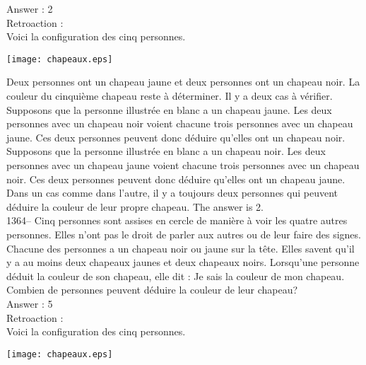 ﻿\documentclass[letterpaper, 12pt]{article}
\begin{document}
Answer : 2\\

Retroaction : \\
Voici la configuration des cinq personnes.
    \begin{center}
    \texttt{[image: chapeaux.eps]}
    \end{center}

Deux personnes ont un chapeau jaune et deux personnes ont un chapeau noir.
La couleur du cinqui\`eme chapeau reste \`a d\'eterminer.  Il y a deux cas
\`a v\'erifier.\\

Supposons que la personne illustr\'ee en blanc a un chapeau jaune.  Les deux
personnes avec un chapeau noir voient chacune trois personnes avec un
chapeau jaune.  Ces deux personnes peuvent donc d\'eduire qu'elles ont un
chapeau noir.  \\
Supposons que la personne illustr\'ee en blanc a un chapeau noir.  Les deux
personnes avec un chapeau jaune voient chacune trois personnes avec un
chapeau noir.  Ces deux personnes peuvent donc d\'eduire qu'elles ont un
chapeau jaune.  \\
Dans un cas comme dans l'autre, il y a toujours deux personnes qui peuvent
d\'eduire la couleur de leur propre chapeau.  The answer is 2.\\

1364-- Cinq personnes sont assises en cercle de mani\`ere \`a voir
les quatre autres personnes.  Elles n'ont pas le droit de parler aux
autres ou de leur faire des signes.  Chacune des personnes a un
chapeau noir ou jaune sur la t\^ete.  Elles savent qu'il y a au
moins deux chapeaux jaunes et deux chapeaux noirs.  Lorsqu'une
personne d\'eduit la couleur de son chapeau, elle dit : \og Je sais
la couleur de mon chapeau\fg .  Combien de personnes
peuvent d\'eduire la couleur de leur chapeau?\\

Answer : 5\\

Retroaction : \\
Voici la configuration des cinq personnes.
    \begin{center}
    \texttt{[image: chapeaux.eps]}
    \end{center}
\end{document}
